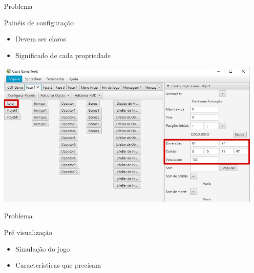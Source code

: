 \documentclass{beamer}
\begin{document}
   \begin{frame}{Problema}
      \begin{block}{Painéis de configuração}
         \begin{itemize}
            \item<+-> Devem ser claros
            \item<+-> Significado de cada propriedade
         \end{itemize}
      \end{block}
   \end{frame}

   \begin{frame}
      \includegraphics[width=\textwidth]{images/obj_dimensoes.jpg}
   \end{frame}

   \begin{frame}{Problema}
      \begin{block}{Pré visualização}
         \begin{itemize}
            \item<+-> Simulação do jogo
            \item<+-> Características que precisam
         \end{itemize}
      \end{block}
   \end{frame}
\end{document}
